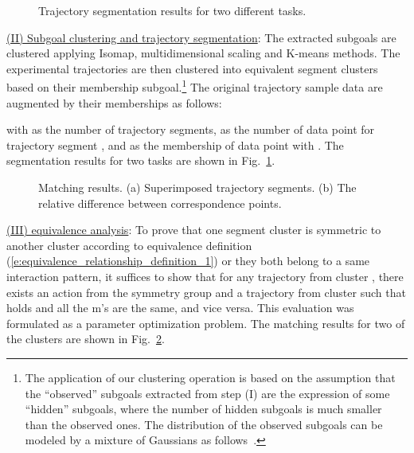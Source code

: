\documentclass[journal]{IEEEtran}
\begin{document}
\begin{figure}[!t]
\centering
{}
\caption{Trajectory segmentation results for two different tasks.} \label{fig:clustering_total}
\end{figure}

\underline{(II) Subgoal clustering and trajectory segmentation}: The extracted subgoals are clustered applying Isomap, multidimensional scaling and K-means methods. The experimental trajectories are then clustered into  equivalent segment clusters based on their membership subgoal.\footnote{The application of our clustering operation is based on the assumption that the ``observed'' subgoals extracted from step (I) are the expression of some ``hidden'' subgoals, where the number of hidden subgoals is much smaller than the observed ones. The distribution of the observed subgoals can be modeled by a mixture of Gaussians as follows~\cite{bishop2006pattern}.} The original trajectory sample data are augmented by their memberships as follows:
 
with  as the number of trajectory segments,  as the number of data point for trajectory segment , and  as the membership of data point  with . The segmentation results for two tasks are shown in Fig.~\ref{fig:clustering_total}. 

\begin{figure}[!t]
\centering
{}
\caption{Matching results. (a) Superimposed trajectory segments. (b) The relative difference between correspondence points.} \label{fig:Single_Matching}
\end{figure}

\underline{(III)  equivalence analysis}: To prove that one segment cluster  is symmetric to another cluster  according to  equivalence definition (\ref{e:equivalence_relationship_definition_1}) or they both belong to a same interaction pattern, it suffices to show that for any trajectory  from cluster , there exists an action  from the symmetry group  and a trajectory  from cluster  such that  holds and all the m's are the same, and vice versa. This evaluation was formulated as a parameter optimization problem. The matching results for two of the clusters are shown in Fig.~\ref{fig:Single_Matching}.
\end{document}
